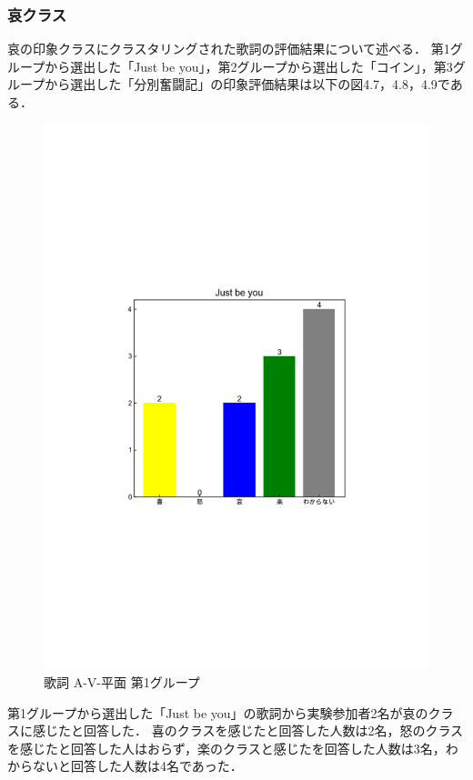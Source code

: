 \subsubsection{哀クラス}
哀の印象クラスにクラスタリングされた歌詞の評価結果について述べる．
第1グループから選出した「Just be you」，第2グループから選出した「コイン」，第3グループから選出した「分別奮闘記」の印象評価結果は以下の図4.7，4.8，4.9である．
\begin{figure}[H]
    \centering
    \includegraphics[width=14cm]{4319.pdf}
    \vspace{-1mm}
    \caption{歌詞 A-V-平面 第1グループ}
    \label{fig:mms}
    \vspace{5mm}
\end{figure}
第1グループから選出した「Just be you」の歌詞から実験参加者2名が哀のクラスに感じたと回答した．
喜のクラスを感じたと回答した人数は2名，怒のクラスを感じたと回答した人はおらず，楽のクラスと感じたを回答した人数は3名，わからないと回答した人数は4名であった．
